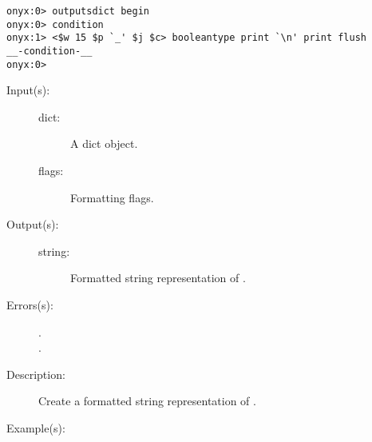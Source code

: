 \begin{description}
\begin{description}
\begin{verbatim}
onyx:0> outputsdict begin
onyx:0> condition
onyx:1> <$w 15 $p `_' $j $c> booleantype print `\n' print flush
__-condition-__
onyx:0>
		\end{verbatim}
	\end{description}
\label{outputsdict:dicttype}
\item[{\onyxop{dict flags}{dicttype}{string}}: ]
	\begin{description}\item[]
	\item[Input(s): ]
		\begin{description}\item[]
		\item[dict: ]
			A dict object.
		\item[flags: ]
			Formatting flags.
		\end{description}
	\item[Output(s): ]
		\begin{description}\item[]
		\item[string: ]
			Formatted string representation of .
		\end{description}
	\item[Errors(s): ]
		\begin{description}\item[]
		\item[.]
		\item[.]
		\end{description}
	\item[Description: ]
		Create a formatted string representation of .
	\item[Example(s): ]\begin{verbatim}


\end{verbatim}
\end{description}
\end{description}

